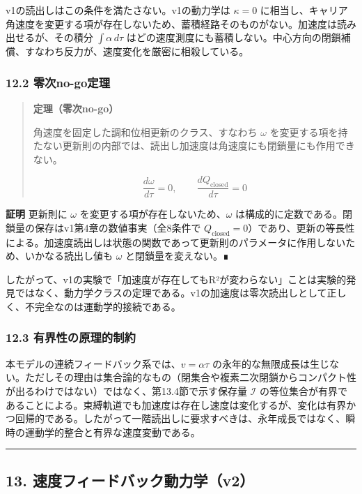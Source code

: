 \documentclass[
  a4paper,
]{ltjsarticle}
\begin{document}
v1の読出しはこの条件を満たさない。v1の動力学は \(\kappa=0\)
に相当し、キャリア角速度を変更する項が存在しないため、蓄積経路そのものがない。加速度は読み出せるが、その積分
\(\int\alpha\,d\tau\)
はどの速度測度にも蓄積しない。中心方向の閉鎖補償、すなわち反力が、速度変化を厳密に相殺している。

\subsubsection{12.2 零次no-go定理}\label{ux96f6ux6b21no-goux5b9aux7406}

\begin{quote}
\textbf{定理（零次no-go）}

角速度を固定した調和位相更新のクラス、すなわち \(\omega\)
を変更する項を持たない更新則の内部では、読出し加速度は角速度にも閉鎖量にも作用できない。

\[
\frac{d\omega}{d\tau}=0,
\qquad
\frac{dQ_{\mathrm{closed}}}{d\tau}=0
\]
\end{quote}

\textbf{証明} 更新則に \(\omega\)
を変更する項が存在しないため、\(\omega\)
は構成的に定数である。閉鎖量の保存はv1第4章の数値事実（全8条件で
\(Q_{\mathrm{closed}}=0\)）であり、更新の等長性による。加速度読出しは状態の関数であって更新則のパラメータに作用しないため、いかなる読出し値も
\(\omega\) と閉鎖量を変えない。∎

したがって、v1の実験で「加速度が存在してもR²が変わらない」ことは実験的発見ではなく、動力学クラスの定理である。v1の加速度は零次読出しとして正しく、不完全なのは運動学的接続である。

\subsubsection{12.3
有界性の原理的制約}\label{ux6709ux754cux6027ux306eux539fux7406ux7684ux5236ux7d04}

本モデルの連続フィードバック系では、\(v=\alpha\tau\)
の永年的な無限成長は生じない。ただしその理由は集合論的なもの（閉集合や複素二次閉鎖からコンパクト性が出るわけではない）ではなく、第13.4節で示す保存量
\(\mathcal I\)
の等位集合が有界であることによる。束縛軌道でも加速度は存在し速度は変化するが、変化は有界かつ回帰的である。したがって一階読出しに要求すべきは、永年成長ではなく、瞬時の運動学的整合と有界な速度変動である。

\begin{center}\rule{0.5\linewidth}{0.5pt}\end{center}

\subsection{13.
速度フィードバック動力学（v2）}\label{ux901fux5ea6ux30d5ux30a3ux30fcux30c9ux30d0ux30c3ux30afux52d5ux529bux5b66v2}
\end{document}
